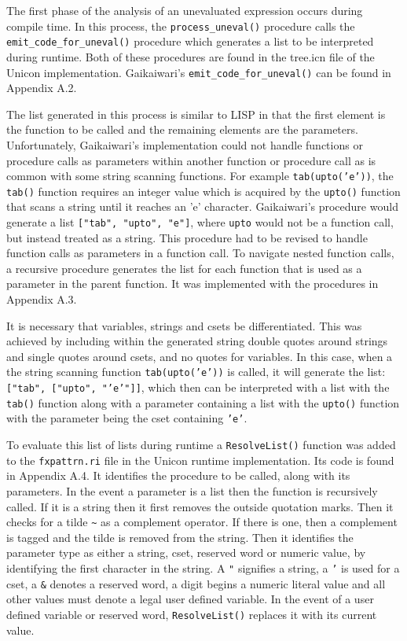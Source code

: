 \documentclass{article}
\begin{document}
The first phase of the analysis of an unevaluated expression occurs during compile time.  In this process, the \texttt{process\_uneval()} procedure calls the \linebreak\texttt{emit\_code\_for\_uneval()} procedure which generates a list to be interpreted during runtime.  Both of these procedures are found in the tree.icn file of the Unicon implementation.  Gaikaiwari's \texttt{emit\_code\_for\_uneval()} can be found in Appendix A.2.

The list generated in this process is similar to LISP in that the first element is the function to be called and the remaining elements are the parameters.  Unfortunately, Gaikaiwari's implementation could not handle functions or procedure calls as parameters within another function or procedure call as is common with some string scanning functions.  For example \texttt{tab(upto('e'))}, the \texttt{tab()} function requires an integer value which is acquired by the \texttt{upto()} function that scans a string until it reaches an 'e' character.  Gaikaiwari's procedure would generate a list \texttt{["tab", "upto", "e"]}, where \texttt{upto} would not be a function call, but instead treated as a string.  This procedure had to be revised to handle function calls as parameters in a function call.  To navigate nested function calls, a recursive procedure generates the list for each function that is used as a parameter in the parent function.  It was implemented with the procedures in Appendix A.3.

It is necessary that variables, strings and csets be differentiated.  This was achieved by including within the generated string double quotes around strings and single quotes around csets, and no quotes for variables.  In this case, when a the string scanning function \texttt{tab(upto('e'))} is called, it will generate the list: \texttt{["tab", ["upto", "'e'"]]}, which then can be interpreted with a list with the \texttt{tab()} function along with a parameter containing a list with the \texttt{upto()} function with the parameter being the cset containing \texttt{'e'}.

\pagebreak
To evaluate this list of lists during runtime a \texttt{ResolveList()} function was added to the \texttt{fxpattrn.ri} file in the Unicon runtime implementation.  Its code is found in Appendix A.4.  It identifies the procedure to be called, along with its parameters.  In the event a parameter is a list then the function is recursively called.  If it is a string then it first removes the outside quotation marks.  Then it checks for a tilde \texttt{\~} as a complement operator.  If there is one, then a complement is tagged and the tilde is removed from the string.  Then it identifies the parameter type as either a string, cset, reserved word or numeric value, by identifying the first character in the string.  A \texttt{"} signifies a string, a \texttt{'} is used for a cset, a \texttt{\&} denotes a reserved word, a digit begins a numeric literal value and all other values must denote a legal user defined variable.  In the event of a user defined variable or reserved word, \texttt{ResolveList()} replaces it with its current value.
\end{document}
